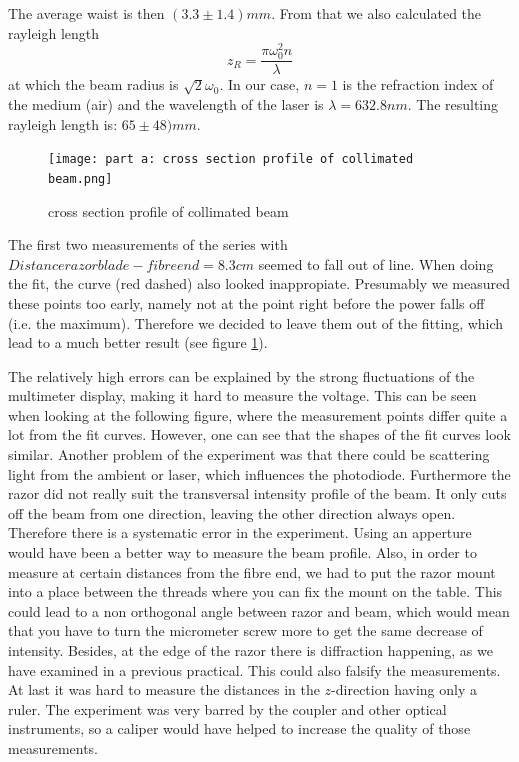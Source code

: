 \documentclass{article}
\begin{document}
The average waist is then $(3.3\pm 1.4) mm$. From that we also calculated the rayleigh length 
\begin{equation}
z_{R} = \frac{\pi\omega_{0}^2 n}{\lambda} 
\label{rayleighlength}
\end{equation}
at which the beam radius is $\sqrt{2}\omega_{0}$. In our case, $n=1$ is the refraction index of the medium (air) and the wavelength of the laser is $\lambda =632.8 nm$. The resulting rayleigh length is:
$65 \pm 48) mm$.\\

\begin{figure}
\texttt{[image: part a: cross section profile of collimated beam.png]}
\caption{cross section profile of collimated beam}
\label{part_a_fig} %
\end{figure}

The first two measurements of the series with $Distance razor blade - fibre end = 8.3 cm$ seemed to fall out of line. When doing the fit, the curve (red dashed) also looked inappropiate. Presumably we measured these points too early, namely not at the point right before the power falls off (i.e. the maximum). Therefore we decided to leave them out of the fitting, which lead to a much better result (see figure \ref{part_a_fig}).

The relatively high errors can be explained by the strong fluctuations of the multimeter display, making it hard to measure the voltage. This can be seen when looking at the following figure, where the measurement points differ quite a lot from the fit curves. However, one can see that the shapes of the fit curves look similar. Another problem of the experiment was that there could be scattering light from the ambient or laser, which influences the photodiode. Furthermore the razor did not really suit the transversal intensity profile of the beam. It only cuts off the beam from one direction, leaving the other direction always open. Therefore there is a systematic error in the experiment. Using an apperture would have been a better way to measure the beam profile. Also, in order to measure at certain distances from the fibre end, we had to put the razor mount into a place between the threads where you can fix the mount on the table. This could lead to a non orthogonal angle between razor and beam, which would mean that you have to turn the micrometer screw more to get the same decrease of intensity. Besides, at the edge of the razor there is diffraction happening, as we have examined in a previous practical. This could also falsify the measurements. At last it was hard to measure the distances in the $z$-direction having only a ruler. The experiment was very barred by the coupler and other optical instruments, so a caliper would have helped to increase the quality of those measurements.
\end{document}
